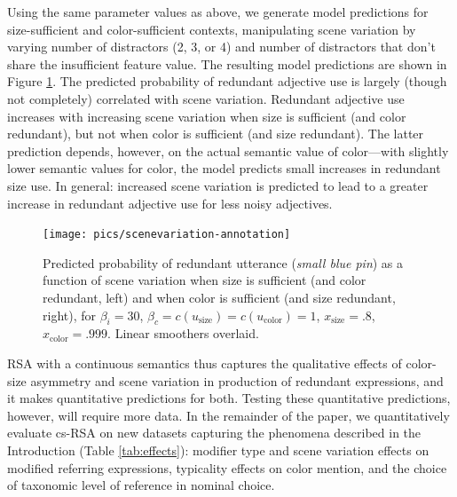 \documentclass[11pt]{article}
\newcommand{\tableref}[1]{Table \ref{#1}}
\newcommand{\figref}[1]{Figure \ref{#1}}
\begin{document}
Using the same parameter values as above, 
we generate model predictions for size-sufficient and color-sufficient contexts, manipulating scene variation by varying number of distractors (2, 3, or 4) and number of distractors that don't share the insufficient feature value. The resulting model predictions are shown in \figref{fig:numdistractors}. The predicted probability of redundant adjective use is largely (though not completely) correlated with scene variation.
Redundant adjective use increases with increasing scene variation when size is sufficient (and color redundant), but not when color is sufficient (and size redundant). 
The latter prediction depends, however, on the actual semantic value of color---with slightly lower semantic values for color, the model predicts small increases in redundant size use. 
In general: increased scene variation is predicted to lead to a greater increase in redundant adjective use for less noisy adjectives.

\begin{figure}
\centering
\texttt{[image: pics/scenevariation-annotation]}
\caption{Predicted probability of redundant utterance (\emph{small blue pin}) as a function of scene variation when size is sufficient (and color redundant, left) and when color is sufficient (and size redundant, right), for $\beta_i = 30$, $ \beta_c = c(u_{\textrm{size}}) = c(u_{\textrm{color}}) = 1$, $x_{\text{size}} = .8$, $x_{\text{color}} = .999$. Linear smoothers overlaid.}
\label{fig:numdistractors}
\end{figure}

RSA with a continuous semantics thus captures the qualitative effects of color-size asymmetry and scene variation in production of redundant expressions, and it makes quantitative predictions for both. Testing these quantitative predictions, however, will require more data. 
In the remainder of the paper, we quantitatively evaluate cs-RSA on new datasets capturing the phenomena described in the Introduction (\tableref{tab:effects}): modifier type and scene variation effects on modified referring expressions, typicality effects on color mention, and the choice of taxonomic level of reference in nominal choice.
\end{document}

